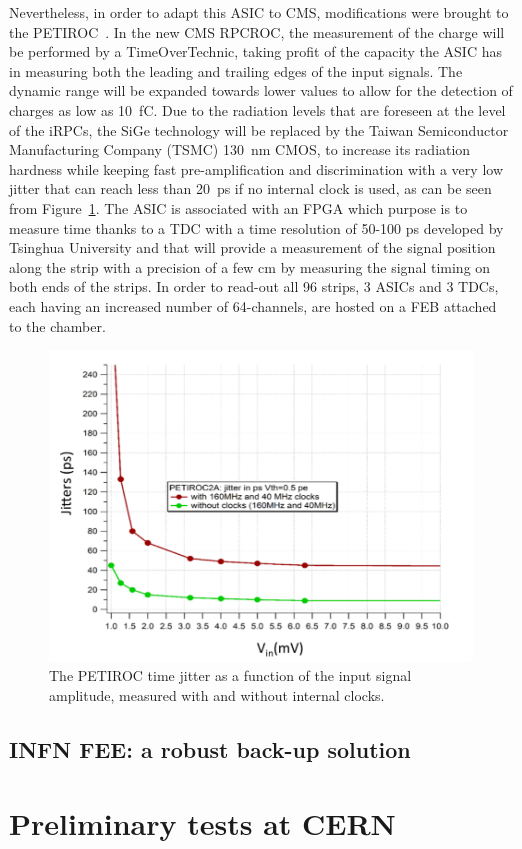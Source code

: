 	Nevertheless, in order to adapt this ASIC to CMS, modifications were brought to the PETIROC~\cite{PHASEIITP}. In the new CMS RPCROC, the measurement of the charge will be performed by a TimeOverTechnic, taking profit of the capacity the ASIC has in measuring both the leading and trailing edges of the input signals. The dynamic range will be expanded towards lower values to allow for the detection of charges as low as \SI{10}{fC}. Due to the radiation levels that are foreseen at the level of the iRPCs, the SiGe technology will be replaced by the Taiwan Semiconductor Manufacturing Company (TSMC) \SI{130}{nm} CMOS, to increase its radiation hardness while keeping fast pre-amplification and discrimination with a very low jitter that can reach less than \SI{20}{ps} if no internal clock is used, as can be seen from Figure~\ref{fig:jitter}. The ASIC is associated with an FPGA which purpose is to measure time thanks to a TDC with a time resolution of 50-100 \si{ps} developed by Tsinghua University and that will provide a measurement of the signal position along the strip with a precision of a few \si{cm} by measuring the signal timing on both ends of the strips. In order to read-out all 96 strips, 3 ASICs and 3 TDCs, each having an increased number of 64-channels, are hosted on a FEB attached to the chamber.

	\begin{figure}[H]
		\centering
		\includegraphics[width=0.8\plotwidth]{fig/chapt6/jitter-PETIROC.png}
		\caption{\label{fig:jitter} The PETIROC time jitter as a function of the input signal amplitude, measured with and without internal clocks.}
	\end{figure}

	\subsection{INFN \acl{FEE}: a robust back-up solution}
	\label{chapt6:ssec:INFN}

\section{Preliminary tests at CERN}

\clearpage{\pagestyle{empty}\cleardoublepage}